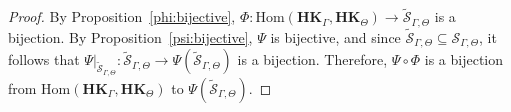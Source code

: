 \documentclass[pdflatex,sn-mathphys-num]{sn-jnl}
\newcommand{\hk}{\mathbf{HK}_{\Theta}}
\newcommand{\hkg}{\mathbf{HK}_{\Gamma}}
\newcommand{\sgt}{\widetilde{\mathcal{S}}_{\Gamma,\Theta}}
\theoremstyle{definition}
\theoremstyle{remark}
\begin{document}
\begin{proof}
   By Proposition~\ref{phi:bijective}, $\Phi : \mathrm{Hom}(\hkg, \hk) \to \sgt$ is a bijection.
   By Proposition~\ref{psi:bijective}, $\Psi$ is bijective, and since $\sgt \subseteq \mathcal{S}_{\Gamma, \Theta}$, it follows that $\Psi|_{\sgt} : \sgt \to \Psi(\sgt)$ is a bijection.
   Therefore, $\Psi \circ \Phi$ is a bijection from $\mathrm{Hom}(\hkg, \hk)$ to $\Psi(\sgt)$.
\end{proof}


































































































\end{document}
